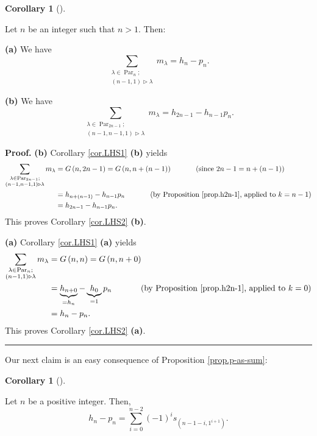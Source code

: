 \documentclass[numbers=enddot,12pt,final,onecolumn,notitlepage]{scrartcl}%
\theoremstyle{definition}
\newtheorem{coro}[theo]{Corollary}
\newenvironment{corollary}[1][]
{\begin{coro}[#1]\begin{leftbar}}
{\end{leftbar}\end{coro}}
\newenvironment{proof}[1][Proof]{\noindent\textbf{#1.} }{\ \rule{0.5em}{0.5em}}
\let\sumnonlimits\sum
\renewcommand{\sum}{\sumnonlimits\limits}
\begin{document}
\begin{corollary}
\label{cor.LHS2}Let $n$ be an integer such that $n>1$. Then:

\textbf{(a)} We have%
\[
\sum_{\substack{\lambda\in\operatorname*{Par}\nolimits_{n};\\\left(
n-1,1\right)  \triangleright\lambda}}m_{\lambda}=h_{n}-p_{n}.
\]


\textbf{(b)} We have%
\[
\sum_{\substack{\lambda\in\operatorname*{Par}\nolimits_{2n-1};\\\left(
n-1,n-1,1\right)  \triangleright\lambda}}m_{\lambda}=h_{2n-1}-h_{n-1}p_{n}.
\]

\end{corollary}

\begin{proof}
\textbf{(b)} Corollary \ref{cor.LHS1} \textbf{(b)} yields%
\begin{align*}
\sum_{\substack{\lambda\in\operatorname*{Par}\nolimits_{2n-1};\\\left(
n-1,n-1,1\right)  \triangleright\lambda}}m_{\lambda}  &  =G\left(
n,2n-1\right)  =G\left(  n,n+\left(  n-1\right)  \right)
\ \ \ \ \ \ \ \ \ \ \left(  \text{since }2n-1=n+\left(  n-1\right)  \right) \\
&  =h_{n+\left(  n-1\right)  }-h_{n-1}p_{n}\ \ \ \ \ \ \ \ \ \ \left(
\text{by Proposition \ref{prop.h2n-1}, applied to }k=n-1\right) \\
&  =h_{2n-1}-h_{n-1}p_{n}.
\end{align*}
This proves Corollary \ref{cor.LHS2} \textbf{(b)}.

\textbf{(a)} Corollary \ref{cor.LHS1} \textbf{(a)} yields%
\begin{align*}
\sum_{\substack{\lambda\in\operatorname*{Par}\nolimits_{n};\\\left(
n-1,1\right)  \triangleright\lambda}}m_{\lambda}  &  =G\left(  n,n\right)
=G\left(  n,n+0\right) \\
&  =\underbrace{h_{n+0}}_{=h_{n}}-\underbrace{h_{0}}_{=1}p_{n}%
\ \ \ \ \ \ \ \ \ \ \left(  \text{by Proposition \ref{prop.h2n-1}, applied to
}k=0\right) \\
&  =h_{n}-p_{n}.
\end{align*}
This proves Corollary \ref{cor.LHS2} \textbf{(a)}.
\end{proof}

Our next claim is an easy consequence of Proposition \ref{prop.p-as-sum}:

\begin{corollary}
\label{cor.p-as-sum-2}Let $n$ be a positive integer. Then,
\[
h_{n}-p_{n}=\sum_{i=0}^{n-2}\left(  -1\right)  ^{i}s_{\left(  n-1-i,1^{i+1}%
\right)  }.
\]

\end{corollary}
\end{document}
